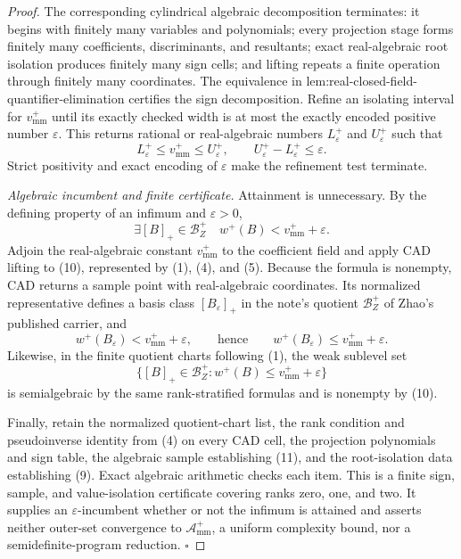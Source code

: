 \documentclass{article}
\begin{document}
\begin{proof}
The corresponding cylindrical algebraic decomposition terminates: it begins with finitely many variables and polynomials; every projection stage forms finitely many coefficients, discriminants, and resultants; exact real-algebraic root isolation produces finitely many sign cells; and lifting repeats a finite operation through finitely many coordinates.  The equivalence in lem:real-closed-field-quantifier-elimination certifies the sign decomposition.  Refine an isolating interval for \(v_{\mathrm{mm}}^+\) until its exactly checked width is at most the exactly encoded positive number \(\varepsilon\).  This returns rational or real-algebraic numbers \(L_\varepsilon^+\) and \(U_\varepsilon^+\) such that
\[
L_\varepsilon^+\le v_{\mathrm{mm}}^+\le U_\varepsilon^+,
\qquad
U_\varepsilon^+-L_\varepsilon^+\le\varepsilon.
\tag{9}
\]
Strict positivity and exact encoding of \(\varepsilon\) make the refinement test terminate.

\emph{Algebraic incumbent and finite certificate.}
Attainment is unnecessary.  By the defining property of an infimum and \(\varepsilon>0\),
\[
\exists [B]_+\in\mathcal B_Z^+
\quad
w^+(B)<v_{\mathrm{mm}}^++\varepsilon.
\tag{10}
\]
Adjoin the real-algebraic constant \(v_{\mathrm{mm}}^+\) to the coefficient field and apply CAD lifting to (10), represented by (1), (4), and (5).  Because the formula is nonempty, CAD returns a sample point with real-algebraic coordinates.  Its normalized representative defines a basis class \([B_\varepsilon]_+\) in the note's quotient \(\mathcal B_Z^+\) of Zhao's published carrier, and
\[
w^+(B_\varepsilon)<v_{\mathrm{mm}}^++\varepsilon,
\qquad\text{hence}\qquad
w^+(B_\varepsilon)\le v_{\mathrm{mm}}^++\varepsilon.
\tag{11}
\]
Likewise, in the finite quotient charts following (1), the weak sublevel set
\[
\{[B]_+\in\mathcal B_Z^+:w^+(B)\le v_{\mathrm{mm}}^++\varepsilon\}
\]
is semialgebraic by the same rank-stratified formulas and is nonempty by (10).

Finally, retain the normalized quotient-chart list, the rank condition and pseudoinverse identity from (4) on every CAD cell, the projection polynomials and sign table, the algebraic sample establishing (11), and the root-isolation data establishing (9).  Exact algebraic arithmetic checks each item.  This is a finite sign, sample, and value-isolation certificate covering ranks zero, one, and two.  It supplies an \(\varepsilon\)-incumbent whether or not the infimum is attained and asserts neither outer-set convergence to \(\mathcal A_{\mathrm{mm}}^+\), a uniform complexity bound, nor a semidefinite-program reduction.  \(\square\)
\end{proof}
\end{document}

